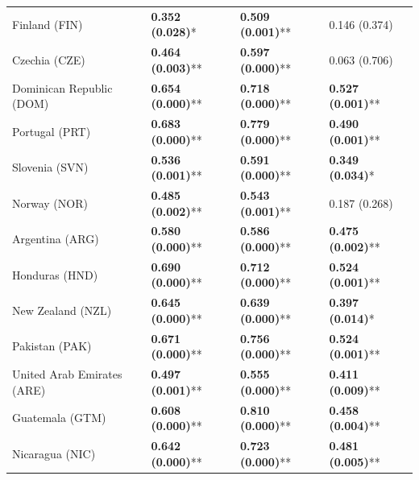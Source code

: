 \begin{longtable}{p{5cm}p{3cm}p{3cm}p{5cm}}
Finland (FIN) & \textcolor{atlLime600}{\textbf{0.352 (0.028)}*} & \textcolor{atlLime600}{\textbf{0.509 (0.001)}**} & \textcolor{atlOrange600}{0.146 (0.374)} \\
Czechia (CZE) & \textcolor{atlLime600}{\textbf{0.464 (0.003)}**} & \textcolor{atlLime600}{\textbf{0.597 (0.000)}**} & \textcolor{atlOrange600}{0.063 (0.706)} \\
Dominican Republic (DOM) & \textcolor{atlLime600}{\textbf{0.654 (0.000)}**} & \textcolor{atlLime600}{\textbf{0.718 (0.000)}**} & \textcolor{atlLime600}{\textbf{0.527 (0.001)}**} \\
Portugal (PRT) & \textcolor{atlLime600}{\textbf{0.683 (0.000)}**} & \textcolor{atlLime600}{\textbf{0.779 (0.000)}**} & \textcolor{atlLime600}{\textbf{0.490 (0.001)}**} \\
Slovenia (SVN) & \textcolor{atlLime600}{\textbf{0.536 (0.001)}**} & \textcolor{atlLime600}{\textbf{0.591 (0.000)}**} & \textcolor{atlLime600}{\textbf{0.349 (0.034)}*} \\
Norway (NOR) & \textcolor{atlLime600}{\textbf{0.485 (0.002)}**} & \textcolor{atlLime600}{\textbf{0.543 (0.001)}**} & \textcolor{atlOrange600}{0.187 (0.268)} \\
Argentina (ARG) & \textcolor{atlLime600}{\textbf{0.580 (0.000)}**} & \textcolor{atlLime600}{\textbf{0.586 (0.000)}**} & \textcolor{atlLime600}{\textbf{0.475 (0.002)}**} \\
Honduras (HND) & \textcolor{atlLime600}{\textbf{0.690 (0.000)}**} & \textcolor{atlLime600}{\textbf{0.712 (0.000)}**} & \textcolor{atlLime600}{\textbf{0.524 (0.001)}**} \\
New Zealand (NZL) & \textcolor{atlLime600}{\textbf{0.645 (0.000)}**} & \textcolor{atlLime600}{\textbf{0.639 (0.000)}**} & \textcolor{atlLime600}{\textbf{0.397 (0.014)}*} \\
Pakistan (PAK) & \textcolor{atlLime600}{\textbf{0.671 (0.000)}**} & \textcolor{atlLime600}{\textbf{0.756 (0.000)}**} & \textcolor{atlLime600}{\textbf{0.524 (0.001)}**} \\
United Arab Emirates (ARE) & \textcolor{atlLime600}{\textbf{0.497 (0.001)}**} & \textcolor{atlLime600}{\textbf{0.555 (0.000)}**} & \textcolor{atlLime600}{\textbf{0.411 (0.009)}**} \\
Guatemala (GTM) & \textcolor{atlLime600}{\textbf{0.608 (0.000)}**} & \textcolor{atlLime600}{\textbf{0.810 (0.000)}**} & \textcolor{atlLime600}{\textbf{0.458 (0.004)}**} \\
Nicaragua (NIC) & \textcolor{atlLime600}{\textbf{0.642 (0.000)}**} & \textcolor{atlLime600}{\textbf{0.723 (0.000)}**} & \textcolor{atlLime600}{\textbf{0.481 (0.005)}**} \\

\end{longtable}
